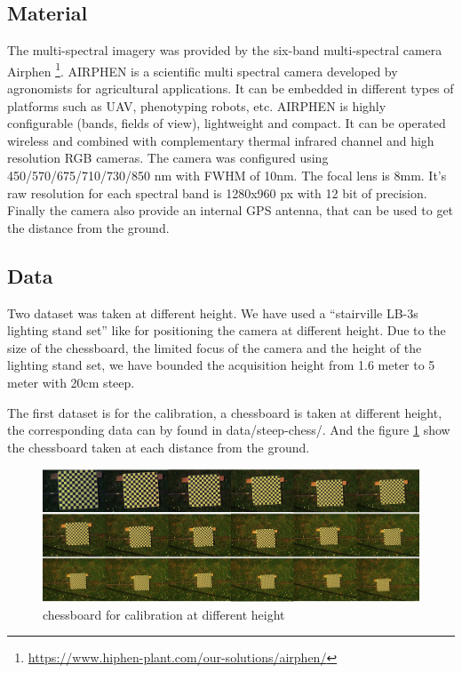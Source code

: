 \documentclass[]{elsarticle}
\begin{document}
		\subsection{Material}
		
		The multi-spectral imagery was provided by the six-band multi-spectral camera Airphen \footnote{\url{https://www.hiphen-plant.com/our-solutions/airphen/}}.
		AIRPHEN is a scientific multi spectral camera developed by agronomists for agricultural applications.
		It can be embedded in different types of platforms such as UAV, phenotyping robots, etc.
		AIRPHEN is highly configurable (bands, fields of view), lightweight and compact.
		It can be operated wireless and combined with complementary thermal infrared channel and high resolution RGB cameras.
		The camera was configured using 450/570/675/710/730/850 nm with FWHM of 10nm.
		The focal lens is 8mm. It's raw resolution for each spectral band is 1280x960 px with 12 bit of precision.
		Finally the camera also provide an internal GPS antenna, that can be used to get the distance from the ground.
	
			
		\subsection{Data}
		
			Two dataset was taken at different height.
			We have used a ``stairville LB-3s lighting stand set'' like for positioning the camera at different height.
			Due to the size of the chessboard, the limited focus of the camera and the height of the lighting stand set,
			we have bounded the acquisition height from 1.6 meter to 5 meter with 20cm steep.
			
			The first dataset is for the calibration, a chessboard is taken at different height, the corresponding data can by found in data/steep-chess/.
			And the figure \ref{fig:calibration} show the chessboard taken at each distance from the ground.
		
			\begin{figure}[!htb]
				\centering
				\includegraphics[width=\linewidth]{../figures/calibration-height.jpg}
				\caption{chessboard for calibration at different height}
				\label{fig:calibration}
			\end{figure}
		
\end{document}

